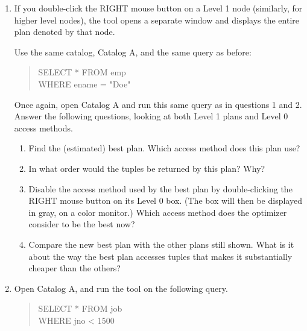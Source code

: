 \begin{enumerate}
\item
If you double-click the RIGHT mouse button on a Level 1 node 
(similarly, for higher
level nodes), the tool opens a separate window and displays the entire plan 
denoted by that node.


Use the same catalog, Catalog A, and the same query as before:
\begin{quote}
        SELECT * FROM emp\\
        WHERE ename = "Doe"
\end{quote}

Once again, open Catalog A and run this same query as in questions 1 and 2.
Answer the following questions, looking at both Level 1 plans and 
Level 0 access methods.
\begin{enumerate}
\item
Find the (estimated) best plan.  Which access method does this plan use?
\item
In what order would the tuples be returned by this plan?  Why?
\item
Disable the access method used by the best plan by double-clicking the
RIGHT mouse button on its Level 0 box.  (The box will then be displayed
in gray, on a color monitor.)  Which access method does the optimizer
consider to be the best now?
\item
Compare the new best plan with the other plans still shown.  What is it
about the way the best plan accesses tuples that makes it substantially
cheaper than the others?
\end{enumerate}


\item

Open Catalog A, and run the tool on the following query.
\begin{quote}
        SELECT * FROM job\\
        WHERE jno < 1500
\end{quote}


\end{enumerate}
